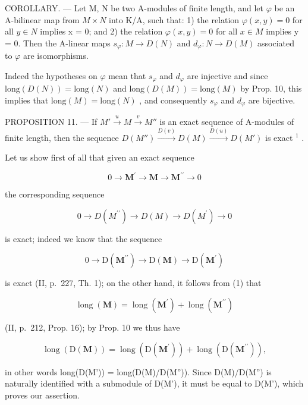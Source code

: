 COROLLARY. --- Let M, N be two A-modules of finite length, and let \(\varphi\) be an A-bilinear map from \(M \times N\) into K/A, such that: 1) the relation \(\varphi(x, y) = 0\) for all \(y \in N\) implies x = 0; and 2) the relation \(\varphi(x, y) = 0\) for all \(x \in M\) implies y = 0. Then the A-linear maps \(s_{\varphi}: M \to D(N)\) and \(d_{\varphi}: N \to D(M)\) associated to \(\varphi\) are isomorphisms.

Indeed the hypotheses on \(\varphi\) mean that \(s_{\varphi}\) and \(d_{\varphi}\) are injective and since \(\text{long}(D(N)) = \text{long}(N)\) and \(\text{long}(D(M)) = \text{long}(M)\) by Prop. 10, this implies that \(\text{long}(M) = \text{long}(N)\) , and consequently \(s_{\varphi}\) and \(d_{\varphi}\) are bijective.

PROPOSITION 11. --- If \(M' \xrightarrow{u} M \xrightarrow{v} M''\) is an exact sequence of A-modules of finite length, then the sequence \(D(M'') \xrightarrow{D(v)} D(M) \xrightarrow{D(u)} D(M')\) is exact \(^{1}\) .

Let us show first of all that given an exact sequence

\[
0 \rightarrow \mathbf {M} ^ {\prime} \rightarrow \mathbf {M} \rightarrow \mathbf {M} ^ {\prime \prime} \rightarrow 0\tag{1}
\]

the corresponding sequence

\[
0 \rightarrow D (M ^ {\prime \prime}) \rightarrow D (M) \rightarrow D (M ^ {\prime}) \rightarrow 0
\]

is exact; indeed we know that the sequence

\[
0 \rightarrow \mathrm{D} (\mathbf {M} ^ {\prime \prime}) \rightarrow \mathrm{D} (\mathbf {M}) \rightarrow \mathrm{D} (\mathbf {M} ^ {\prime})
\]

is exact (II, p.~227, Th. 1); on the other hand, it follows from (1) that

\[
\operatorname{long} (\mathbf {M}) = \operatorname{long} \left(\mathbf {M} ^ {\prime}\right) + \operatorname{long} \left(\mathbf {M} ^ {\prime \prime}\right)
\]

(II, p.~212, Prop. 16); by Prop. 10 we thus have

\[
\operatorname{long} \left(\mathrm{D} (\mathbf {M})\right) = \operatorname{long} \left(\mathrm{D} \left(\mathbf {M} ^ {\prime}\right)\right) + \operatorname{long} \left(\mathrm{D} \left(\mathbf {M} ^ {\prime \prime}\right)\right),
\]

in other words long(D(M')) = long(D(M)/D(M'')). Since D(M)/D(M'') is naturally identified with a submodule of D(M'), it must be equal to D(M'), which proves our assertion.

